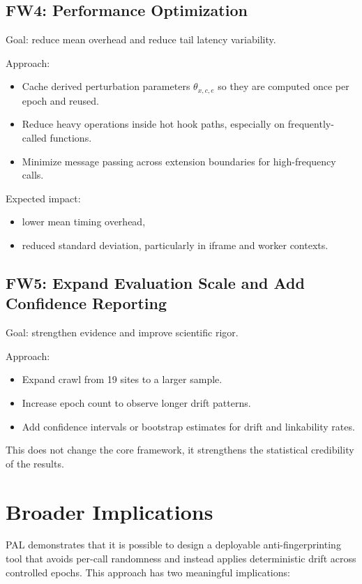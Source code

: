 \documentclass[11pt]{report}
\begin{document}
\subsection{FW4: Performance Optimization}

Goal: reduce mean overhead and reduce tail latency variability.

Approach:
\begin{itemize}
    \item Cache derived perturbation parameters $\theta_{x,c,e}$ so they are computed once per epoch and reused.
    \item Reduce heavy operations inside hot hook paths, especially on frequently-called functions.
    \item Minimize message passing across extension boundaries for high-frequency calls.
\end{itemize}

Expected impact:
\begin{itemize}
    \item lower mean timing overhead,
    \item reduced standard deviation, particularly in iframe and worker contexts.
\end{itemize}

\subsection{FW5: Expand Evaluation Scale and Add Confidence Reporting}

Goal: strengthen evidence and improve scientific rigor.

Approach:
\begin{itemize}
    \item Expand crawl from 19 sites to a larger sample.
    \item Increase epoch count to observe longer drift patterns.
    \item Add confidence intervals or bootstrap estimates for drift and linkability rates.
\end{itemize}

This does not change the core framework, it strengthens the statistical credibility of the results.

\section{Broader Implications}

PAL demonstrates that it is possible to design a deployable anti-fingerprinting tool that avoids per-call randomness and instead applies deterministic drift across controlled epochs. This approach has two meaningful implications:
\end{document}
